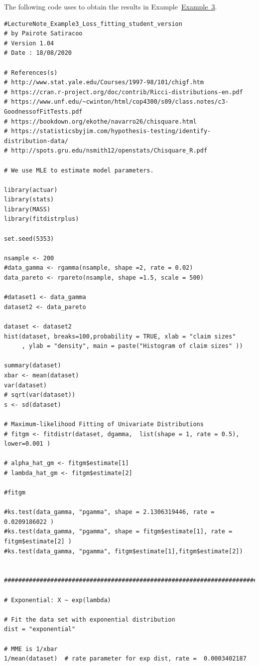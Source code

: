 \documentclass[
]{book}
\theoremstyle{definition}
\theoremstyle{definition}
\theoremstyle{definition}
\theoremstyle{definition}
\theoremstyle{remark}
\begin{document}
The following code uses to obtain the results in
Example~\protect\hyperlink{exampleFittingClaimSizes}{Example~3}.

\begin{verbatim}
#LectureNote_Example3_Loss_fitting_student_version
# by Pairote Satiracoo
# Version 1.04
# Date : 18/08/2020

# References(s)
# http://www.stat.yale.edu/Courses/1997-98/101/chigf.htm
# https://cran.r-project.org/doc/contrib/Ricci-distributions-en.pdf
# https://www.unf.edu/~cwinton/html/cop4300/s09/class.notes/c3-GoodnessofFitTests.pdf
# https://bookdown.org/ekothe/navarro26/chisquare.html
# https://statisticsbyjim.com/hypothesis-testing/identify-distribution-data/
# http://spots.gru.edu/nsmith12/openstats/Chisquare_R.pdf

# We use MLE to estimate model parameters.

library(actuar)
library(stats)
library(MASS)
library(fitdistrplus)

set.seed(5353)

nsample <- 200
#data_gamma <- rgamma(nsample, shape =2, rate = 0.02)
data_pareto <- rpareto(nsample, shape =1.5, scale = 500)

#dataset1 <- data_gamma
dataset2 <- data_pareto

dataset <- dataset2
hist(dataset, breaks=100,probability = TRUE, xlab = "claim sizes" 
     , ylab = "density", main = paste("Histogram of claim sizes" ))

summary(dataset)
xbar <- mean(dataset)
var(dataset)
# sqrt(var(dataset))
s <- sd(dataset)

# Maximum-likelihood Fitting of Univariate Distributions
# fitgm <- fitdistr(dataset, dgamma,  list(shape = 1, rate = 0.5), lower=0.001 )

# alpha_hat_gm <- fitgm$estimate[1]
# lambda_hat_gm <- fitgm$estimate[2]

#fitgm

#ks.test(data_gamma, "pgamma", shape = 2.1306319446, rate = 0.0209186022 )
#ks.test(data_gamma, "pgamma", shape = fitgm$estimate[1], rate = fitgm$estimate[2] )
#ks.test(data_gamma, "pgamma", fitgm$estimate[1],fitgm$estimate[2])


################################################################################

# Exponential: X ~ exp(lambda)

# Fit the data set with exponential distribution
dist = "exponential"

# MME is 1/xbar
1/mean(dataset)  # rate parameter for exp dist, rate =  0.0003402187


\end{verbatim}
\end{document}
